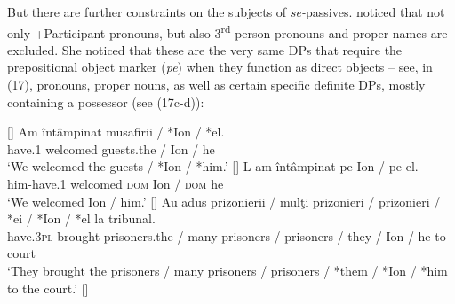 \documentclass[output=paper]{langsci/langscibook}
\begin{document}
But there are further constraints on the subjects of \textit{se-}passives. \citet{Cornilescu1998} noticed that not only +Participant pronouns, but also 3\textsuperscript{rd} person pronouns and proper names are excluded. She noticed that these are the very same DPs that require the prepositional object marker (\textit{pe}) when they function as direct objects – see, in (17), pronouns, proper nouns, as well as certain specific definite DPs, mostly containing a possessor (see (17c-d)):

\ea%
    \label{ex:giurgea:17}
    \begin{xlista}[c{'}{'}.]
    []{
    \gll Am     întâmpinat musafirii / *Ion / *el.\\
         have.\textsc{1} welcomed guests.the / Ion / he   \\
    \glt ‘We welcomed  the guests / *Ion / *him.’}
    []{
    \gll L-am          întâmpinat pe   Ion  / pe    el. \\
                him-have.\textsc{1} welcomed \textsc{dom} Ion / \textsc{dom} he\\
    \glt        ‘We welcomed  Ion / him.’}
    []{
    \gll Au          adus     prizonierii    / mulţi prizonieri  / prizonieri / *ei / *Ion / *el la tribunal.\\
         have.\textsc{3pl} brought prisoners.the / many prisoners / prisoners / they / Ion / he    to court\\
    \glt ‘They brought the prisoners / many prisoners / prisoners / *them / *Ion / *him to the court.’}
    []{
}
\end{xlista}
\end{document}

